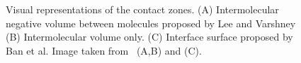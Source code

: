 \begin{figure}[h]
\vspace{10pt}
  \begin{center}
  \caption{Visual representations of the contact zones. (A) Intermolecular negative volume between molecules proposed by Lee and Varshney (B) Intermolecular volume only. (C) Interface surface proposed by Ban et al. Image taken from~\cite{lee2006computing} (A,B) and \cite{ban2006interface} (C).}
  \label{Fig:pdbsum}  
  \end{center}
\end{figure}

